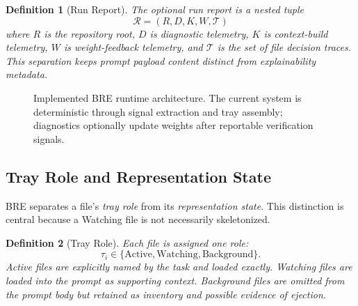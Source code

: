 \documentclass[11pt,onecolumn]{article}
\newtheorem{definition}{Definition}
\begin{document}
\begin{definition}[Run Report]
The optional run report is a nested tuple
\begin{equation}
\mathcal{R} = (R, D, K, W, \mathcal{T})
\end{equation}
where $R$ is the repository root, $D$ is diagnostic telemetry, $K$ is context-build telemetry, $W$ is weight-feedback telemetry, and $\mathcal{T}$ is the set of file decision traces. This separation keeps prompt payload content distinct from explainability metadata.
\end{definition}

\begin{figure}[h]
\centering
{}
\caption{Implemented BRE runtime architecture. The current system is deterministic through signal extraction and tray assembly; diagnostics optionally update weights after reportable verification signals.}
\end{figure}

\subsection{Tray Role and Representation State}
BRE separates a file's \emph{tray role} from its \emph{representation state}. This distinction is central because a Watching file is not necessarily skeletonized.

\begin{definition}[Tray Role]
Each file is assigned one role:
\begin{equation}
\tau_i \in \{\text{Active}, \text{Watching}, \text{Background}\}.
\end{equation}
Active files are explicitly named by the task and loaded exactly. Watching files are loaded into the prompt as supporting context. Background files are omitted from the prompt body but retained as inventory and possible evidence of ejection.
\end{definition}
\end{document}
